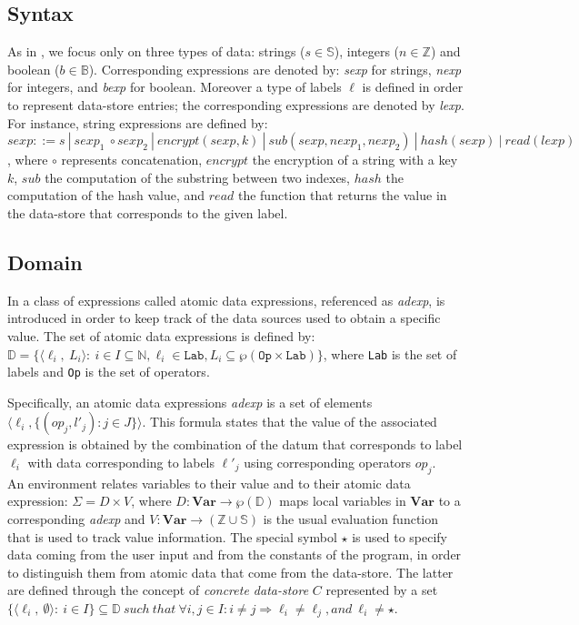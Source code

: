 \documentclass{llncs}
\begin{document}
\subsection{Syntax}
As in \cite{Cortesi15}, we focus only on three types of data: strings ($s \in \mathbb{S}$), integers ($n \in \mathbb{Z}$) and boolean ($b \in \mathbb{B}$). Corresponding expressions are denoted by: \emph{sexp} for strings, \emph{nexp} for integers, and \emph{bexp} for boolean. Moreover a type of labels $\ell$ is defined in order to represent data-store entries; the corresponding expressions are denoted by \emph{lexp}. 
For instance, string expressions are defined by: $sexp ::= s\ |\ sexp_{1}\ \circ  sexp_{2} \ |\   encrypt(sexp,k) \ |\  sub(sexp,nexp_1,nexp_2)\ |\ \allowbreak hash(sexp)\ |\ read(lexp)$, where $\circ$ represents concatenation, $encrypt$ the encryption of a string with a key $k$, $sub$ the computation of the substring between two indexes, $hash$ the computation of the hash value, and $read$ the function that returns the value in the data-store that corresponds to the given label. 

\subsection{Domain}
In  \cite{Cortesi15} a class of expressions called atomic data expressions, referenced as \emph{adexp}, is introduced  in order to keep track of the data sources used to obtain a specific value. The set of atomic data expressions is defined by: $\mathbb{D}=\{\langle \ell_i,\ L_i\rangle :\ i \in I \subseteq \mathbb{N}, \ell_i \in \texttt{Lab}, L_i \subseteq \wp(\texttt{Op} \times \texttt{Lab})\} $, where \texttt{Lab} is the set of labels and \texttt{Op} is the set of operators. 

Specifically, an atomic data expressions \emph{adexp} is a set of elements $\langle \ell_i, \{(op_j,l'_j):j\in J\} \rangle$. This formula states that the value of the associated expression is obtained by the combination of the datum that corresponds to label $\ell_i$ with data corresponding to labels $\ell'_j$ using corresponding operators $op_j$.\\


An environment relates variables to their value and to their atomic data expression:   $\Sigma=D\times V$, where $D: \mathbf{Var} \longrightarrow \wp(\mathbb{D}) $ maps local variables in $\mathbf{Var}$ to a corresponding \emph{adexp} and $V: \mathbf{Var} \longrightarrow (\mathbb{Z}\cup\mathbb{S})$ is the usual evaluation function that is used to track value information. The special symbol $\star$ is used to specify data coming from the user input and from the constants of the program, in order to distinguish them from atomic data that come from the data-store. The latter are defined through the concept of \emph{concrete data-store} $C$ represented by a set $\{\langle \ell_i,\ \emptyset\rangle :\ i \in I\} \subseteq \mathbb{D}\ such\ that\ \forall i,j \in I:i\neq j \Rightarrow \ell_i\neq \ell_j, and\ \ell_i \neq \star $.\\ 
\end{document}
